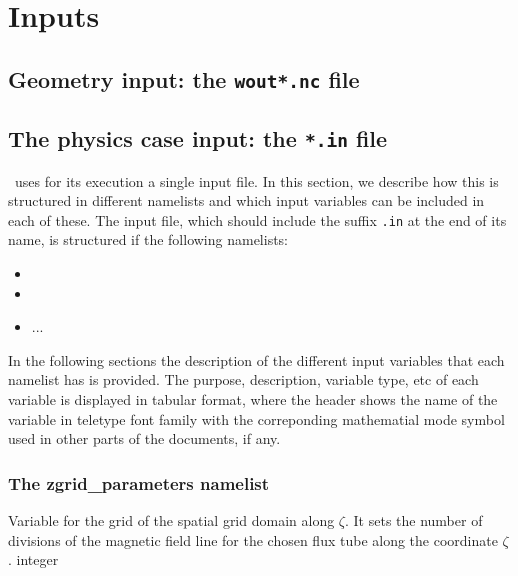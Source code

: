 \chapter{Inputs}\label{CHAP_INPUT}


\section{Geometry input: the \texttt{wout*.nc} file}

\section{The physics case input: the \texttt{*.in} file}

\stella~uses for its execution a single input file. In this section, 
we describe how this is structured in different 
namelists and which input variables can be included in each of these. The input file, 
which should include the suffix \texttt{.in} at the end of its name, is structured
if the following namelists:

\begin{itemize}
\item {}
\item {}
\item ...
\end{itemize}

In the following sections the description of the different input variables that 
each namelist has is provided. The purpose, description, variable type, etc
of each variable is displayed in tabular format, where the header shows the name of the 
variable in  teletype font family with the correponding mathematial mode symbol 
used in other parts of the documents, if any.



\subsection{The {\ttfamily zgrid\_parameters} namelist}\label{sec:NL_ZGRID}


{Variable for the grid of the spatial grid domain along $\zeta$.
It sets the number of divisions of the magnetic field line 
for the chosen flux tube along the coordinate $\zeta$.}
{integer}{}

